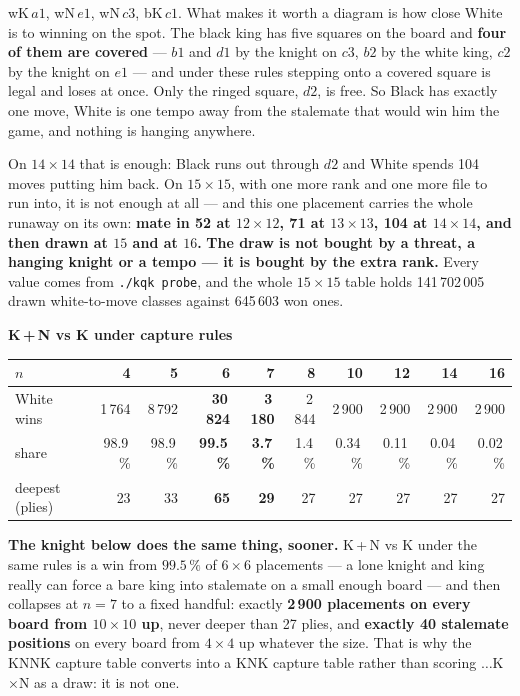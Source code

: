 \documentclass[11pt]{article}
\begin{document}
\noindent
wK\,$a1$, wN\,$e1$, wN\,$c3$, bK\,$c1$. What makes it worth a diagram is how
close White is to winning on the spot. The black king has five squares on the
board and \textbf{four of them are covered} --- $b1$ and $d1$ by the knight on
$c3$, $b2$ by the white king, $c2$ by the knight on $e1$ --- and under these
rules stepping onto a covered square is legal and loses at once. Only the
ringed square, $d2$, is free. So Black has exactly one move, White is one
tempo away from the stalemate that would win him the game, and nothing is
hanging anywhere.

\smallskip
\noindent
On $14\times14$ that is enough: Black runs out through $d2$ and White spends
104 moves putting him back. On $15\times15$, with one more rank and one more
file to run into, it is not enough at all --- and this one placement carries
the whole runaway on its own: \textbf{mate in 52 at $12\times12$, 71 at
$13\times13$, 104 at $14\times14$, and then drawn at $15$ and at $16$.}
\textbf{The draw is not bought by a threat, a hanging knight or a tempo --- it
is bought by the extra rank.} Every value comes from \texttt{./kqk probe}, and
the whole $15\times15$ table holds 141\,702\,005 drawn white-to-move classes
against 645\,603 won ones.

\begin{center}\small
\textbf{K\,+\,N vs K under capture rules}\\[1mm]
\begin{tabular}{@{}lrrrrrrrrr@{}}
\toprule
$n$ & 4 & 5 & \textbf{6} & \textbf{7} & 8 & 10 & 12 & 14 & 16 \\
\midrule
White wins & 1\,764 & 8\,792 & \textbf{30\,824} &
  \textbf{3\,180} & 2\,844 & 2\,900 & 2\,900 & 2\,900 & 2\,900 \\
share & 98.9\,\% & 98.9\,\% & \textbf{99.5\,\%} & \textbf{3.7\,\%} &
  1.4\,\% & 0.34\,\% & 0.11\,\% & 0.04\,\% & 0.02\,\% \\
deepest (plies) & 23 & 33 & \textbf{65} & \textbf{29} & 27 & 27 & 27 & 27 & 27 \\
\bottomrule
\end{tabular}
\end{center}

\noindent
\textbf{The knight below does the same thing, sooner.} K\,+\,N vs K under the
same rules is a win from $99.5\,\%$ of $6\times6$ placements --- a lone knight
and king really can force a bare king into stalemate on a small enough board
--- and then collapses at $n=7$ to a fixed handful: exactly \textbf{2\,900
placements on every board from $10\times10$ up}, never deeper than 27 plies,
and \textbf{exactly 40 stalemate positions} on every board from $4\times4$ up
whatever the size. That is why the KNNK capture table converts into a KNK
capture table rather than scoring $\ldots$K$\times$N as a draw: it is not one.
\end{document}
